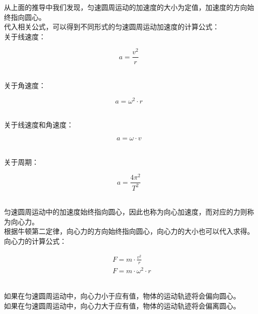 \documentclass[UTF8]{ctexart}
\begin{document}
\newpage

    从上面的推导中我们发现，匀速圆周运动的加速度的大小为定值，加速度的方向始终指向圆心。\\[4mm]
    代入相关公式，可以得到不同形式的匀速圆周运动加速度的计算公式：\\[3mm]
    关于线速度：
    \begin{large}
        \begin{equation*}
            a=\frac{v^2}{r}
        \end{equation*}
    \end{large}\\
    关于角速度：
    \begin{large}
        \begin{equation*}
            a=\omega^2\cdot r
        \end{equation*}
    \end{large}\\
    关于线速度和角速度：
    \begin{large}
        \begin{equation*}
            a=\omega\cdot v
        \end{equation*}
    \end{large}\\
    关于周期：
    \begin{large}
        \begin{equation*}
            a=\frac{4\pi^2}{T^2}
        \end{equation*}
    \end{large}\\[6mm]
    匀速圆周运动中的加速度始终指向圆心，因此也称为向心加速度，而对应的力则称为向心力。\\[8mm]
    根据牛顿第二定律，向心力的方向始终指向圆心，向心力的大小也可以代入求得。\\[3mm]
    向心力的计算公式：
    \begin{large}
        \begin{align*}
            &F=m\cdot \frac{v^2}{r}\\[5mm]
            &F=m\cdot\omega^2\cdot r
        \end{align*}
    \end{large}\\
    如果在匀速圆周运动中，向心力小于应有值，物体的运动轨迹将会偏向圆心。\\[3mm]
    如果在匀速圆周运动中，向心力大于应有值，物体的运动轨迹将会偏离圆心。
    
\newpage
\end{document}

